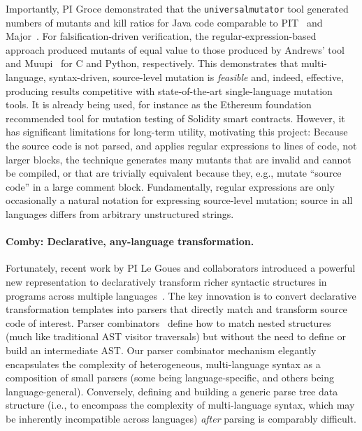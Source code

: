 Importantly,  PI Groce demonstrated that the {\tt universalmutator} tool generated
numbers of mutants and kill ratios for Java code comparable to
PIT~\cite{pittest} and Major~\cite{Major}.  For falsification-driven
verification, the regular-expression-based approach produced mutants of equal
value to those produced by Andrews' tool~\cite{mutant} and Muupi~\cite{muupi}
for C and Python, respectively.
This demonstrates that multi-language, syntax-driven, source-level mutation is
\emph{feasible} and, indeed, effective, producing results competitive with
state-of-the-art single-language mutation tools.  It is already being
used, for instance as the Ethereum foundation recommended tool for mutation testing of
Solidity smart contracts.
However, it has significant limitations for long-term utility,
motivating this project: Because the source
code is not parsed, and applies regular expressions to lines of code, not
larger blocks, the technique generates many mutants that are invalid
and cannot be compiled, or that are trivially equivalent because they, e.g.,
mutate ``source code'' in a large comment block.
Fundamentally, regular expressions are
only occasionally a natural notation for expressing source-level mutation;
source in all languages differs from arbitrary unstructured strings.

\paragraph{Comby: Declarative, any-language transformation.} Fortunately, recent work by PI
Le Goues and collaborators introduced a powerful new representation to
declaratively transform richer syntactic structures in programs across multiple
languages~\cite{rvt-ppc}. The key innovation is to convert declarative
transformation templates into parsers that directly match and transform source
code of interest. Parser
combinators~\cite{Hutton96monadicparser} define how to match nested structures (much like traditional AST
visitor traversals) but without the need to define or build an intermediate AST.
Our parser combinator mechanism elegantly encapsulates the complexity of
heterogeneous, multi-language syntax as a composition of small parsers (some
being language-specific, and others being language-general). Conversely, defining and
building a generic parse tree data structure (i.e., to encompass the complexity
of multi-language syntax, which may be inherently incompatible across languages)
\emph{after} parsing is comparably difficult.

